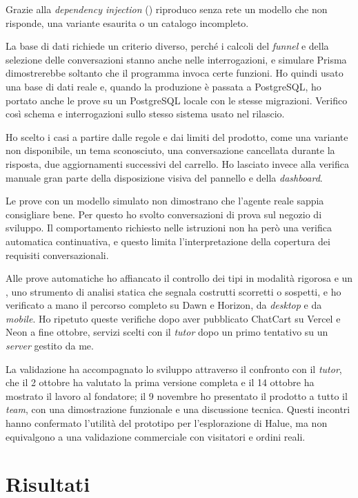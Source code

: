Grazie alla \emph{dependency injection} () riproduco senza rete un
modello che non risponde, una variante esaurita o un catalogo incompleto.

La base di dati richiede un criterio diverso, perché i calcoli del \emph{funnel} e della selezione
delle conversazioni stanno anche nelle interrogazioni, e simulare Prisma dimostrerebbe soltanto che
il programma invoca certe funzioni. Ho quindi usato una base di dati reale e, quando la produzione
è passata a PostgreSQL, ho portato anche le prove su un PostgreSQL locale con le stesse
migrazioni. Verifico così schema e interrogazioni sullo stesso sistema usato nel rilascio.

Ho scelto i casi a partire dalle regole e dai limiti del prodotto, come una variante non
disponibile, un
tema sconosciuto, una conversazione cancellata durante la risposta, due aggiornamenti successivi del
carrello. Ho lasciato invece alla verifica manuale gran parte della disposizione visiva del
pannello e della \emph{dashboard}.

Le prove con un modello simulato non dimostrano che l’agente reale sappia consigliare bene. Per
questo ho svolto conversazioni di prova sul negozio di sviluppo. Il comportamento richiesto nelle
istruzioni non ha però una verifica automatica continuativa, e questo limita l’interpretazione
della copertura dei requisiti
conversazionali.

Alle prove automatiche ho affiancato il controllo dei tipi in modalità rigorosa e un
, uno strumento di analisi statica che segnala costrutti scorretti o
sospetti, e ho verificato a mano il percorso completo su Dawn e Horizon, da \emph{desktop} e da
\emph{mobile}. Ho ripetuto queste verifiche dopo aver pubblicato ChatCart su Vercel e Neon a fine
ottobre, servizi scelti con il \emph{tutor} dopo un primo tentativo su un \emph{server} gestito da me.

La validazione ha accompagnato lo sviluppo attraverso il confronto con il \emph{tutor}, che il 2
ottobre ha valutato la prima versione completa e il 14 ottobre ha mostrato il lavoro al fondatore;
il 9 novembre ho presentato il prodotto a tutto il \emph{team}, con una dimostrazione funzionale e
una discussione tecnica. Questi incontri hanno confermato l’utilità del prototipo per
l’esplorazione di Halue, ma non equivalgono a una validazione commerciale con visitatori e ordini
reali.


\section{Risultati}

